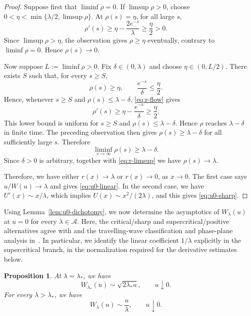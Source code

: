 \documentclass[12pt]{amsart}
\numberwithin{equation}{section}
\theoremstyle{plain}
\newtheorem{proposition}[theorem]{Proposition}
\theoremstyle{definition}
\begin{document}
\begin{proof}
Suppose first that \(\liminf\rho=0\).  If \(\limsup\rho>0\), choose
\(0<\eta<\min\{\lambda/2,\limsup\rho\}\).  At \(\rho(s)=\eta\), for all large \(s\),
\[
 \rho'(s)\ge\eta-\frac{2e^{-s}}\lambda\ge\frac\eta2>0.
\]
Since \(\limsup\rho>\eta\), the observation gives \(\rho\ge\eta\) eventually,
contrary to \(\liminf\rho=0\).  Hence \(\rho(s)\to0\).

Now suppose \(L:=\liminf\rho>0\).  Fix \(\delta\in(0,\lambda)\) and choose
\(\eta\in(0,L/2)\).  There exists \(S\) such that, for every \(s\ge S\),
\[
 \rho(s)\ge\eta,
 \qquad
 \frac{e^{-s}}\delta\le\frac\eta2.
\]
Hence, whenever \(s\ge S\) and \(\rho(s)\le\lambda-\delta\),
\eqref{eq:r-flow} gives
\[
 \rho'(s)
 \ge\eta-\frac{e^{-s}}\delta
 \ge\frac\eta2.
\]
This lower bound is uniform for $s\ge S$ and
$\rho(s)\le\lambda-\delta$.  Hence $\rho$ reaches
$\lambda-\delta$ in finite time.  The preceding observation then gives
\(\rho(s)\ge\lambda-\delta\) for all sufficiently large \(s\).  Therefore
\[
 \liminf_{s\to\infty}\rho(s)\ge\lambda-\delta.
\]
Since \(\delta>0\) is arbitrary, together with \eqref{eq:r-limsup} we have
\(\rho(s)\to\lambda\).

Therefore, we have either \(r(x)\to \lambda\) or \(r(x)\to0\), as \(x\to 0\).  The first case says
\(u/W(u)\to \lambda\) and gives \eqref{eq:u0-linear}.  In the second case, we have
\(U'(x)\sim x/\lambda\), which implies
\(U(x)\sim x^2/(2\lambda)\), and this gives
\eqref{eq:u0-sharp}.
\end{proof}

Using Lemma~\ref{lem:u0-dichotomy}, we now determine the asymptotics of
$W_\lambda(u)$ at $u=0$ for every $\lambda\in\mathcal A$. Here, the critical/sharp and supercritical/positive alternatives agree with
\cite{EnguicaGavioliSanchez2013} and the travelling-wave classification
and phase-plane analysis in~\cite{AudritoVazquez2017}. In particular, we
identify the linear coefficient $1/\lambda$ explicitly in the supercritical
branch, in the normalization required for the derivative estimates below.

\begin{proposition}
\label{prop:critical-branches}
At \(\lambda = \lambda_*\), we have
\begin{equation}
 W_{\lambda_*}(u)\sim\sqrt{2\lambda_*u},
 \qquad u\downarrow0.
 \label{eq:critical-sharp-branch}
\end{equation}
For every \(\lambda>\lambda_*\), we have
\begin{equation}
 W_\lambda(u)\sim\frac u\lambda,
 \qquad u\downarrow0.
 \label{eq:supercritical-linear-branch}
\end{equation}
\end{proposition}
\end{document}
